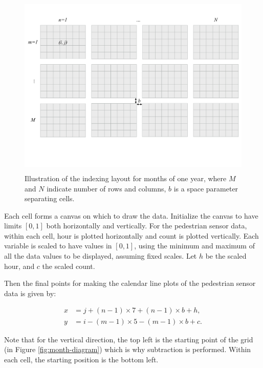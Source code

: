 \documentclass[12pt]{article}
\begin{document}
\begin{figure}

{\centering \includegraphics[width=360pt,height=250pt]{img/year-diagram} 

}

\caption{Illustration of the indexing layout for months of one year, where $M$ and $N$ indicate number of rows and columns, $b$ is a space parameter separating cells.}\label{fig:year-diagram}
\end{figure}

Each cell forms a canvas on which to draw the data. Initialize the
canvas to have limits \([0, 1]\) both horizontally and vertically. For
the pedestrian sensor data, within each cell, hour is plotted
horizontally and count is plotted vertically. Each variable is scaled to
have values in \([0,1]\), using the minimum and maximum of all the data
values to be displayed, assuming fixed scales. Let \(h\) be the scaled
hour, and \(c\) the scaled count.

Then the final points for making the calendar line plots of the
pedestrian sensor data is given by:

\begin{equation}
  \begin{aligned}
  x &= j + (n - 1) \times 7 + (n - 1) \times b + h, \\
  y &= i - (m - 1) \times 5 - (m - 1) \times b + c. \label{eq:final}
  \end{aligned}
\end{equation}

Note that for the vertical direction, the top left is the starting point
of the grid (in Figure \ref{fig:month-diagram}) which is why subtraction
is performed. Within each cell, the starting position is the bottom
left.
\end{document}
